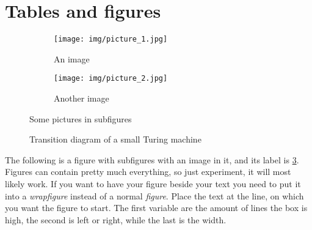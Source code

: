 \documentclass[english]{article}
\begin{document}
\section{Tables and figures}
\begin{figure}[ht!] %
  \centering

  \begin{subfigure}{0.59\linewidth}
    \centering
    
    \texttt{[image: img/picture\_1.jpg]}
    
    \caption{An image}
    \label{fig example: sub figure 1}
  \end{subfigure}
  \begin{subfigure}{0.39\linewidth}
    \centering
    
    \texttt{[image: img/picture\_2.jpg]}
    
    \caption{Another image}
    \label{fig example: sub figure 2}
  \end{subfigure}


  \caption{Some pictures in subfigures}
  \label{FigExample}
\end{figure}

\begin{wrapfigure}[7]{r}{15em}
  \centering
  \caption{Transition diagram of a small Turing machine}
  \label{fig:TM2}
\end{wrapfigure}
The following is a figure with subfigures with an image in it, and its label is
\ref{FigExample}. Figures can contain pretty much everything, so just
experiment, it will most likely work. If you want to have your figure beside
your text you need to put it into a \emph{wrapfigure} instead of a normal
\emph{figure}. Place the text at the line, on which you want the figure to
start. The first variable are the amount of lines the box is high, the second is
left or right, while the last is the width.
\end{document}
